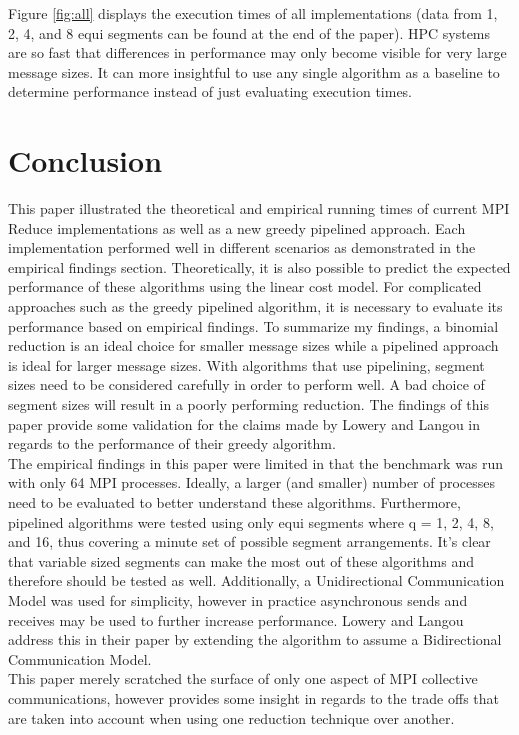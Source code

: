\documentclass{article}
\begin{document}
Figure \ref{fig:all} displays the execution
times of all implementations (data from 1, 2, 4,
and 8 equi segments can be found at the end of
the paper). HPC systems are so fast that
differences in performance may only become
visible for very large message sizes. It can more insightful to use any single
algorithm as a baseline to determine
performance instead of just evaluating
execution times.

\section{Conclusion}

This paper illustrated the theoretical and empirical running times of current MPI Reduce
implementations as well as a new greedy pipelined approach. Each implementation performed well in
different scenarios as demonstrated in the empirical findings section. Theoretically, it is also possible to
predict the expected performance of these algorithms using the linear cost model. For complicated
approaches such as the greedy pipelined algorithm, it is necessary to evaluate its performance based on
empirical findings. To summarize my findings, a binomial reduction is an ideal choice for smaller
message sizes while a pipelined approach is ideal for larger message sizes. With algorithms that use
pipelining, segment sizes need to be considered carefully in order to perform well. A bad choice of
segment sizes will result in a poorly performing reduction. The findings of this paper provide some
validation for the claims made by Lowery and Langou in regards to the performance of their greedy
algorithm. \\

The empirical findings in this paper were limited in that the benchmark was run with only 64 MPI
processes. Ideally, a larger (and smaller) number of processes need to be evaluated to better understand
these algorithms. Furthermore, pipelined algorithms were tested using only equi segments where q = 1, 2,
4, 8, and 16, thus covering a minute set of possible segment arrangements. It’s clear that variable sized
segments can make the most out of these algorithms and therefore should be tested as well. Additionally,
a Unidirectional Communication Model was used for simplicity, however in practice asynchronous sends
and receives may be used to further increase performance. Lowery and Langou \cite{Lowery-13} address this 
in their paper by extending the algorithm to assume a Bidirectional Communication Model. \\

This paper merely scratched the surface of only one aspect of MPI collective communications,
however provides some insight in regards to the trade offs that are taken into account when using
one reduction technique over another.



\end{document}
